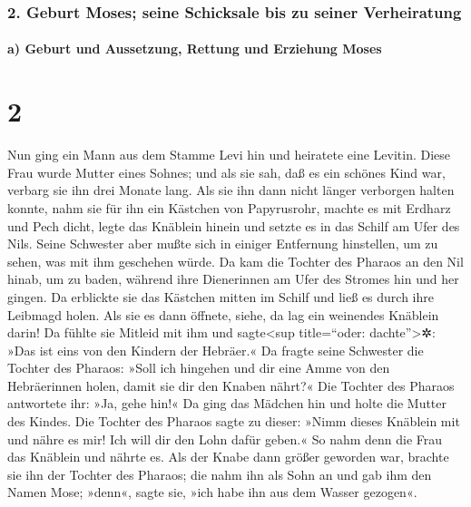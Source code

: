 \hypertarget{geburt-moses-seine-schicksale-bis-zu-seiner-verheiratung}{%
\subsubsection{2. Geburt Moses; seine Schicksale bis zu seiner
Verheiratung}\label{geburt-moses-seine-schicksale-bis-zu-seiner-verheiratung}}

\hypertarget{a-geburt-und-aussetzung-rettung-und-erziehung-moses}{%
\paragraph{a) Geburt und Aussetzung, Rettung und Erziehung
Moses}\label{a-geburt-und-aussetzung-rettung-und-erziehung-moses}}

\hypertarget{section-1}{%
\section{2}\label{section-1}}

 Nun ging ein Mann aus dem Stamme Levi hin und heiratete
eine Levitin.  Diese Frau wurde Mutter eines Sohnes; und
als sie sah, daß es ein schönes Kind war, verbarg sie ihn drei Monate
lang.  Als sie ihn dann nicht länger verborgen halten
konnte, nahm sie für ihn ein Kästchen von Papyrusrohr, machte es mit
Erdharz und Pech dicht, legte das Knäblein hinein und setzte es in das
Schilf am Ufer des Nils.  Seine Schwester aber mußte sich
in einiger Entfernung hinstellen, um zu sehen, was mit ihm geschehen
würde.  Da kam die Tochter des Pharaos an den Nil hinab,
um zu baden, während ihre Dienerinnen am Ufer des Stromes hin und her
gingen. Da erblickte sie das Kästchen mitten im Schilf und ließ es durch
ihre Leibmagd holen.  Als sie es dann öffnete, siehe, da
lag ein weinendes Knäblein darin! Da fühlte sie Mitleid mit ihm und
sagte\textless sup title=``oder: dachte''\textgreater✲: »Das ist eins
von den Kindern der Hebräer.«  Da fragte seine Schwester
die Tochter des Pharaos: »Soll ich hingehen und dir eine Amme von den
Hebräerinnen holen, damit sie dir den Knaben nährt?«  Die
Tochter des Pharaos antwortete ihr: »Ja, gehe hin!« Da ging das Mädchen
hin und holte die Mutter des Kindes.  Die Tochter des
Pharaos sagte zu dieser: »Nimm dieses Knäblein mit und nähre es mir! Ich
will dir den Lohn dafür geben.« So nahm denn die Frau das Knäblein und
nährte es.  Als der Knabe dann größer geworden war,
brachte sie ihn der Tochter des Pharaos; die nahm ihn als Sohn an und
gab ihm den Namen Mose; »denn«, sagte sie, »ich habe ihn aus dem Wasser
gezogen«.


